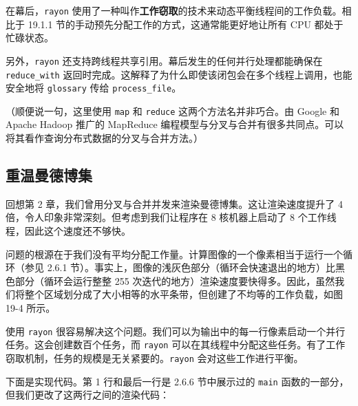 在幕后，\texttt{rayon} 使用了一种叫作\textbf{工作窃取}的技术来动态平衡线程间的工作负载。相比于 19.1.1 节的手动预先分配工作的方式，这通常能更好地让所有 CPU 都处于忙碌状态。

另外，\texttt{rayon} 还支持跨线程共享引用。幕后发生的任何并行处理都能确保在 \texttt{reduce\_with} 返回时完成。这解释了为什么即使该闭包会在多个线程上调用，也能安全地将 \texttt{glossary} 传给 \texttt{process\_file}。

（顺便说一句，这里使用 \texttt{map} 和 \texttt{reduce} 这两个方法名并非巧合。由 Google 和 Apache Hadoop 推广的 MapReduce 编程模型与分叉与合并有很多共同点。可以将其看作查询分布式数据的分叉与合并方法。）

\subsection{重温曼德博集}

回想第 2 章，我们曾用分叉与合并并发来渲染曼德博集。这让渲染速度提升了 4 倍，令人印象非常深刻。但考虑到我们让程序在 8 核机器上启动了 8 个工作线程，因此这个速度还不够快。

问题的根源在于我们没有平均分配工作量。计算图像的一个像素相当于运行一个循环（参见 2.6.1 节）。事实上，图像的浅灰色部分（循环会快速退出的地方）比黑色部分（循环会运行整整 255 次迭代的地方）渲染速度要快得多。因此，虽然我们将整个区域划分成了大小相等的水平条带，但创建了不均等的工作负载，如图 19-4 所示。


使用 \texttt{rayon} 很容易解决这个问题。我们可以为输出中的每一行像素启动一个并行任务。这会创建数百个任务，而 \texttt{rayon} 可以在其线程中分配这些任务。有了工作窃取机制，任务的规模是无关紧要的。\texttt{rayon} 会对这些工作进行平衡。

下面是实现代码。第 1 行和最后一行是 2.6.6 节中展示过的 \texttt{main} 函数的一部分，但我们更改了这两行之间的渲染代码：

